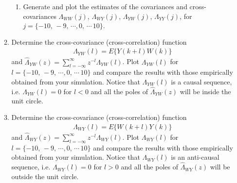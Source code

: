 \documentclass[letterpaper,12pt]{article}
\begin{document}
\begin{enumerate}
\begin{enumerate}
\begin{enumerate}

    \item
    Generate and plot the estimates of the covariances and cross-covariances $\Lambda_{WW}(j)$, $\Lambda_{WY}(j)$,  $\Lambda_{YW}(j)$, $\Lambda_{YY}(j)$, for $j = \{-10,\, -9,\, \cdots ,0,\, \cdots \,10\}$. %

\end{enumerate}

\item
Determine the cross-covariance (cross-correlation) function
\begin{align*}
    \Lambda_{YW}(l) = E\{Y(k+l)W(k)\}
\end{align*}
and $\hat{\Lambda}_{YW}(z) = \sum_{l=-\infty}^{\infty} z^{-l} \Lambda_{YW}(l)$. Plot $\Lambda_{YW}(l)$ for $l = \{-10,\, -9,\, \cdots ,0,\, \cdots \,10\}$ and compare the results with those empirically obtained from your simulation. Notice that $\Lambda_{YW}(l)$ is a causal sequence, i.e. $\Lambda_{YW}(l) = 0$ for $ l < 0$ and all the poles of $\hat{\Lambda}_{YW}(z)$ will be inside the unit circle.

\item
Determine the cross-covariance (cross-correlation) function
\begin{align*}
    \Lambda_{WY}(l) = E\{W(k+l)Y(k)\}
\end{align*}
and $\hat{\Lambda}_{WY}(z) = \sum_{l=-\infty}^{\infty} z^{-l} \Lambda_{WY}(l)$. Plot $\Lambda_{WY}(l)$ for $l = \{-10,\, -9,\, \cdots ,0,\, \cdots \,10\}$ and compare the results with those empirically obtained from your simulation. Notice that $\Lambda_{WY}(l)$ is an anti-causal sequence, i.e. $\Lambda_{WY}(l) = 0$ for $ l > 0$ and all the poles of $\hat{\Lambda}_{WY}(z)$ will be outside the unit circle.



\end{enumerate}
\end{enumerate}
\end{document}
